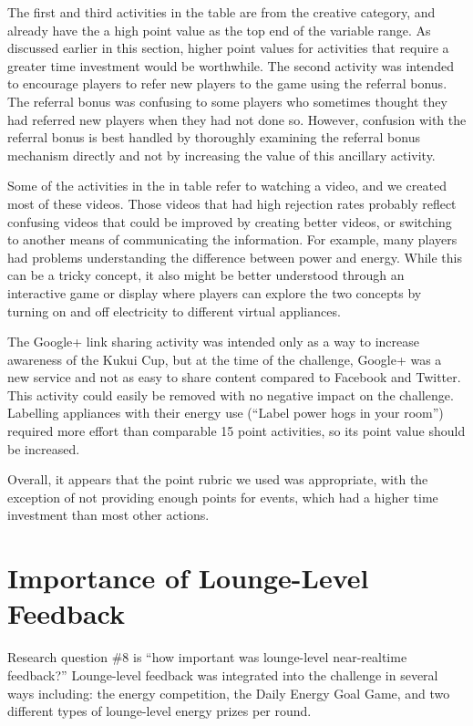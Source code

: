 The first and third activities in the table are from the creative category, and already have the a high point value as the top end of the variable range. As discussed earlier in this section, higher point values for activities that require a greater time investment would be worthwhile. The second activity was intended to encourage players to refer new players to the game using the referral bonus. The referral bonus was confusing to some players who sometimes thought they had referred new players when they had not done so. However, confusion with the referral bonus is best handled by thoroughly examining the referral bonus mechanism directly and not by increasing the value of this ancillary activity.

Some of the activities in the in table refer to watching a video, and we created most of these videos. Those videos that had high rejection rates probably reflect confusing videos that could be improved by creating better videos, or switching to another means of communicating the information. For example, many players had problems understanding the difference between power and energy. While this can be a tricky concept, it also might be better understood through an interactive game or display where players can explore the two concepts by turning on and off electricity to different virtual appliances.

The Google+ link sharing activity was intended only as a way to increase awareness of the Kukui Cup, but at the time of the challenge, Google+ was a new service and not as easy to share content compared to Facebook and Twitter. This activity could easily be removed with no negative impact on the challenge. Labelling appliances with their energy use (``Label power hogs in your room'') required more effort than comparable 15 point activities, so its point value should be increased.

Overall, it appears that the point rubric we used was appropriate, with the exception of not providing enough points for events, which had a higher time investment than most other actions.


\section{Importance of Lounge-Level Feedback}

Research question \#8 is ``how important was lounge-level near-realtime feedback?'' Lounge-level feedback was integrated into the challenge in several ways including: the energy competition, the Daily Energy Goal Game, and two different types of lounge-level energy prizes per round.

